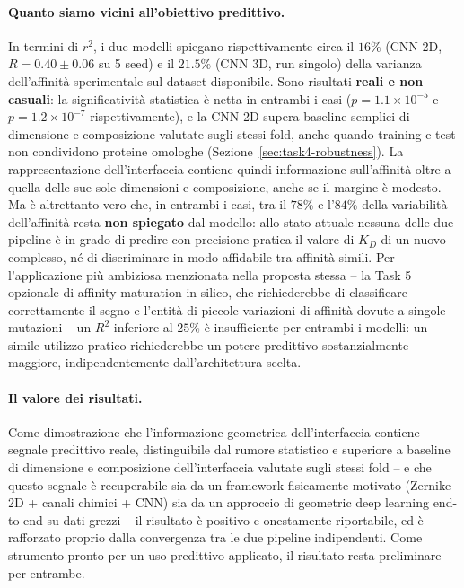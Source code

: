 \documentclass[11pt,a4paper]{article}
\begin{document}
\paragraph{Quanto siamo vicini all'obiettivo predittivo.} In termini di $r^2$, i due modelli spiegano rispettivamente circa il $16\%$ (CNN 2D, $R = 0.40 \pm 0.06$ su 5 seed) e il $21.5\%$ (CNN 3D, run singolo) della varianza dell'affinità sperimentale sul dataset disponibile. Sono risultati \textbf{reali e non casuali}: la significatività statistica è netta in entrambi i casi ($p=1.1\times10^{-5}$ e $p=1.2\times10^{-7}$ rispettivamente), e la CNN 2D supera baseline semplici di dimensione e composizione valutate sugli stessi fold, anche quando training e test non condividono proteine omologhe (Sezione~\ref{sec:task4-robustness}). La rappresentazione dell'interfaccia contiene quindi informazione sull'affinità oltre a quella delle sue sole dimensioni e composizione, anche se il margine è modesto. Ma è altrettanto vero che, in entrambi i casi, tra il $78\%$ e l'$84\%$ della variabilità dell'affinità resta \textbf{non spiegato} dal modello: allo stato attuale nessuna delle due pipeline è in grado di predire con precisione pratica il valore di $K_D$ di un nuovo complesso, né di discriminare in modo affidabile tra affinità simili. Per l'applicazione più ambiziosa menzionata nella proposta stessa -- la Task 5 opzionale di affinity maturation in-silico, che richiederebbe di classificare correttamente il segno e l'entità di piccole variazioni di affinità dovute a singole mutazioni -- un $R^2$ inferiore al $25\%$ è insufficiente per entrambi i modelli: un simile utilizzo pratico richiederebbe un potere predittivo sostanzialmente maggiore, indipendentemente dall'architettura scelta.

\paragraph{Il valore dei risultati.} Come dimostrazione che l'informazione geometrica dell'interfaccia contiene segnale predittivo reale, distinguibile dal rumore statistico e superiore a baseline di dimensione e composizione dell'interfaccia valutate sugli stessi fold -- e che questo segnale è recuperabile sia da un framework fisicamente motivato (Zernike 2D + canali chimici + CNN) sia da un approccio di geometric deep learning end-to-end su dati grezzi -- il risultato è positivo e onestamente riportabile, ed è rafforzato proprio dalla convergenza tra le due pipeline indipendenti. Come strumento pronto per un uso predittivo applicato, il risultato resta preliminare per entrambe.
\end{document}
